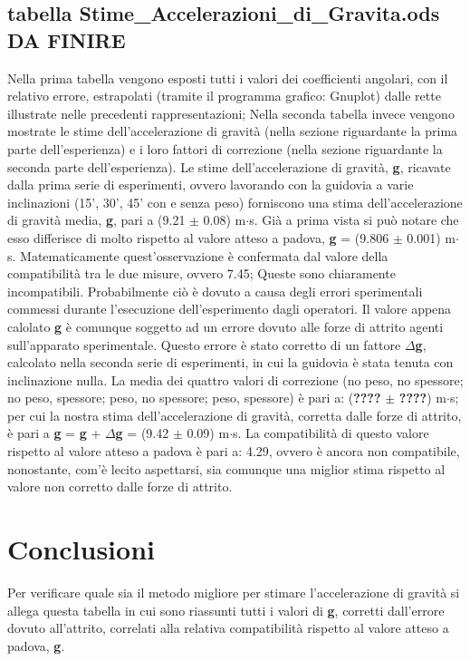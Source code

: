 \documentclass[12pt]{article} %
\begin{document}
	\subsection {tabella Stime_Accelerazioni_di_Gravita.ods DA FINIRE}
Nella prima tabella vengono esposti tutti i valori dei coefficienti angolari, con il relativo errore, estrapolati (tramite il programma grafico: Gnuplot) dalle rette illustrate nelle precedenti rappresentazioni;
Nella seconda tabella invece vengono mostrate le stime dell'accelerazione di gravità (nella sezione riguardante la prima parte dell'esperienza) e i loro fattori di correzione (nella sezione riguardante la seconda parte dell'esperienza).  
Le stime dell'accelerazione di gravità, \textbf{g}, ricavate dalla prima serie di esperimenti, ovvero lavorando con la guidovia a varie inclinazioni (15', 30', 45' con e senza peso) forniscono una stima dell'accelerazione di gravità media, \textbf{g}, pari a (9.21 $\pm$ 0.08) m$\cdot$s. Già a prima vista si può notare che esso differisce di molto rispetto al valore atteso a padova, \textbf{g} = (9.806 $\pm$ 0.001) m$\cdot$s. Matematicamente quest'osservazione è confermata dal valore della compatibilità tra le due misure, ovvero 7.45; Queste sono chiaramente incompatibili. Probabilmente ciò è dovuto a causa degli errori sperimentali commessi durante l'esecuzione dell'esperimento dagli operatori.
Il valore appena calolato \textbf{g} è comunque soggetto ad un errore dovuto alle forze di attrito agenti sull'apparato sperimentale. Questo errore è stato corretto di un fattore $\Delta$\textbf{g}, calcolato nella seconda serie di esperimenti, in cui la guidovia è stata tenuta con inclinazione nulla. La media dei quattro valori di correzione (no peso, no spessore; no peso, spessore; peso, no spessore; peso, spessore) è pari a: (\textbf{????} $\pm$ \textbf{????}) m$\cdot$s;
per cui la nostra stima dell'accelerazione di gravità, corretta dalle forze di attrito, è pari a \textbf{g} = \textbf{g} + $\Delta$\textbf{g} = (9.42 $\pm$ 0.09) m$\cdot$s.
La compatibilità di questo valore rispetto al valore atteso a padova è pari a: 4.29, ovvero è ancora non compatibile, nonostante, com'è lecito aspettarsi, sia comunque una miglior stima rispetto al valore non corretto dalle forze di attrito. 
\section{Conclusioni}
	Per verificare quale sia il metodo migliore per stimare l'accelerazione di gravità si allega questa tabella in cui sono riassunti tutti i valori di \textbf{g}, corretti dall'errore dovuto all'attrito, correlati alla relativa compatibilità rispetto al valore atteso a padova, \textbf{g}.
\end{document}
